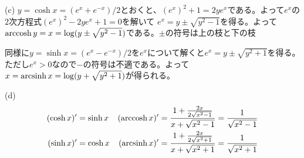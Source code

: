 \noindent (c) 
$y=\cosh x = (e^x+e^{-x})/2$とおくと、$(e^x)^2 + 1 = 2ye^x$である。よって$e^x$の$2$次方程式$(e^x)^2 - 2y e^x+1=0$を解いて
$e^x = y\pm\sqrt{y^2-1}$を得る。よって$\operatorname{arccosh} y = x = \log(y\pm\sqrt{y^2-1})$である。$\pm$の符号は上の枝と下の枝

同様に$y=\sinh x = (e^x - e^{-x})/2$を$e^x$について解くと$e^x=y\pm\sqrt{y^2+1}$を得る。ただし$e^x>0$なので$-$の符号は不適である。よって$x=\operatorname{arcsinh} x=\log(y+\sqrt{y^2+1})$が得られる。

\noindent (d)
\begin{align*}
(\cosh x)' &= \sinh x & 
(\operatorname{arccosh} x)' &= \frac{1+\frac{2x}{2\sqrt{x^2-1}}}{x+\sqrt{x^2-1}} = \frac{1}{\sqrt{x^2-1}} \\
(\sinh x)' &= \cosh x &
(\operatorname{arcsinh} x)' &= \frac{1+\frac{2x}{2\sqrt{x^2+1}}}{x+\sqrt{x^2+1}} = \frac{1}{\sqrt{x^2+1}}
\end{align*}
